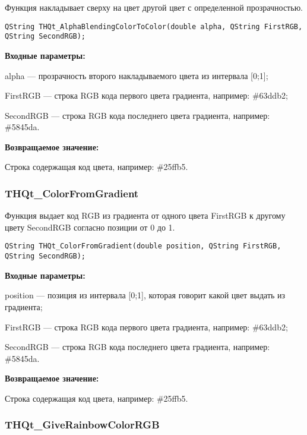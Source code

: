 \documentclass[a4paper,12pt]{article}
\begin{document}
Функция накладывает сверху на цвет другой цвет с определенной прозрачностью.


\begin{lstlisting}[label=code_syntax_THQt_AlphaBlendingColorToColor,caption=Синтаксис]
QString THQt_AlphaBlendingColorToColor(double alpha, QString FirstRGB, QString SecondRGB);
\end{lstlisting}

\textbf{Входные параметры:}

alpha --- прозрачность второго накладываемого цвета из интервала [0;1];
 
    FirstRGB --- строка RGB кода первого цвета градиента, например: \#63ddb2;
 
    SecondRGB --- строка RGB кода последнего цвета градиента, например: \#5845da.

\textbf{Возвращаемое значение:}

Строка содержащая код цвета, например: \#25ffb5.


\subsubsection{THQt\_ColorFromGradient}\label{THQt_ColorFromGradient}

Функция выдает код RGB из градиента от одного цвета FirstRGB к другому цвету SecondRGB согласно позиции от 0 до 1.


\begin{lstlisting}[label=code_syntax_THQt_ColorFromGradient,caption=Синтаксис]
QString THQt_ColorFromGradient(double position, QString FirstRGB, QString SecondRGB);
\end{lstlisting}

\textbf{Входные параметры:}

position --- позиция из интервала [0;1], которая говорит какой цвет выдать из градиента;
 
    FirstRGB --- строка RGB кода первого цвета градиента, например: \#63ddb2;
 
    SecondRGB --- строка RGB кода последнего цвета градиента, например: \#5845da.

\textbf{Возвращаемое значение:}

Строка содержащая код цвета, например: \#25ffb5.


\subsubsection{THQt\_GiveRainbowColorRGB}\label{THQt_GiveRainbowColorRGB}
\end{document}
